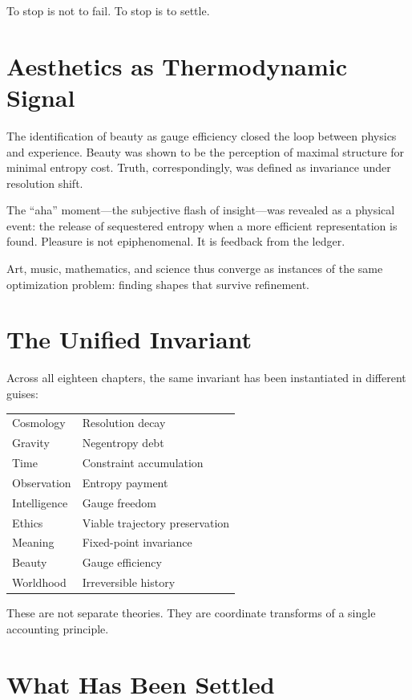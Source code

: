 \documentclass[11pt]{book}
\begin{document}
To stop is not to fail.
To stop is to settle.

\section{Aesthetics as Thermodynamic Signal}

The identification of beauty as gauge efficiency closed the loop between physics
and experience. Beauty was shown to be the perception of maximal structure for
minimal entropy cost. Truth, correspondingly, was defined as invariance under
resolution shift.

The “aha” moment—the subjective flash of insight—was revealed as a physical
event: the release of sequestered entropy when a more efficient representation
is found. Pleasure is not epiphenomenal. It is feedback from the ledger.

Art, music, mathematics, and science thus converge as instances of the same
optimization problem: finding shapes that survive refinement.

\section{The Unified Invariant}

Across all eighteen chapters, the same invariant has been instantiated in
different guises:

\begin{center}
\begin{tabular}{l l}
Cosmology & Resolution decay \\
Gravity & Negentropy debt \\
Time & Constraint accumulation \\
Observation & Entropy payment \\
Intelligence & Gauge freedom \\
Ethics & Viable trajectory preservation \\
Meaning & Fixed-point invariance \\
Beauty & Gauge efficiency \\
Worldhood & Irreversible history
\end{tabular}
\end{center}

These are not separate theories. They are coordinate transforms of a single
accounting principle.

\section{What Has Been Settled}
\end{document}
